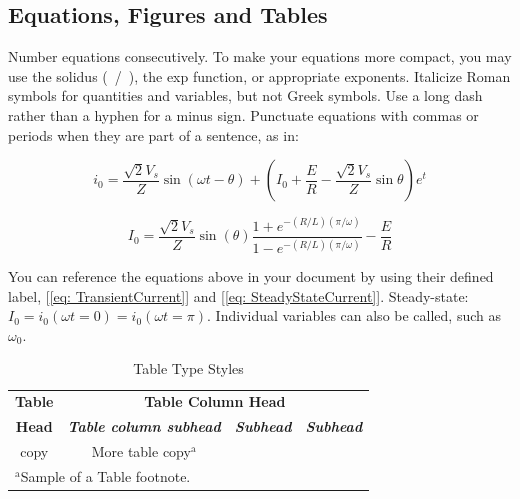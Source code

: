 \subsection{Equations, Figures and Tables}

Number equations consecutively. To make your  equations more compact, you may use the solidus (~/~), the exp function, or  appropriate exponents. Italicize Roman symbols for quantities and variables, 
but not Greek symbols. Use a long dash rather than a hyphen for a minus  sign. Punctuate equations with commas or periods when they are part of a sentence, as in:

\begin{equation} \label{eq: TransientCurrent}
	i_0 = \frac{\sqrt{2}V_s}{Z}\sin(\omega t-\theta) + \left(I_0 + \frac{E}{R} - \frac{\sqrt{2}V_s}{Z}\sin\theta \right) e^{t}
\end{equation}

\begin{equation} \label{eq: SteadyStateCurrent}
	I_0 = \frac{\sqrt{2}V_s}{Z}\sin(\theta)\frac{1+e^{-(R/L)(\pi/\omega)}}{1-e^{-(R/L)(\pi/\omega)}} - \frac{E}{R}
\end{equation}


You can reference the equations above in your document by using their defined label, [\ref{eq: TransientCurrent}] and [\ref{eq: SteadyStateCurrent}]. Steady-state: $I_0= i_0(\omega t =0) = i_0(\omega t = \pi)$. Individual variables can also be called, such as $\omega_0$. 




\begin{table}[htbp]
	\caption{Table Type Styles}
	\begin{center}
		\begin{tabular}{|c|c|c|c|}
			\hline  
			\textbf{Table}&\multicolumn{3}{|c|}{\textbf{Table Column Head}} \\
			\cline{2-4} 
			\textbf{Head} & \textbf{\textit{Table column subhead}}& \textbf{\textit{Subhead}}& \textbf{\textit{Subhead}} \\
			\hline
			copy& More table copy$^{\mathrm{a}}$& &  \\
			\hline
			\multicolumn{4}{l}{$^{\mathrm{a}}$Sample of a Table footnote.}
		\end{tabular}
	\label{tab1}
	\end{center}
\end{table}





